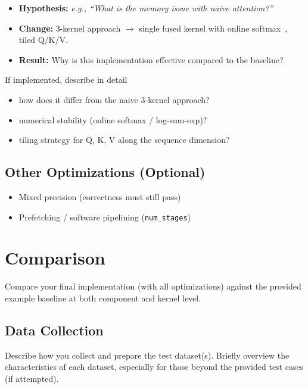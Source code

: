 \documentclass{article} %
\begin{document}
\begin{itemize}
    \item \textbf{Hypothesis:} \textit{e.g., ``What is the memory issue with naive attention?''}
    \item \textbf{Change:} 3-kernel approach $\to$ single fused kernel with online softmax~\citep{dao2023flashattention2fasterattentionbetter}, tiled Q/K/V.
    \item \textbf{Result:} Why is this implementation effective compared to the baseline?
\end{itemize}

If implemented, describe in detail 
\begin{itemize}
    \item how does it differ from the naive 3-kernel approach?
    \item numerical stability (online softmax / log-sum-exp)?
    \item tiling strategy for Q, K, V along the sequence dimension?
\end{itemize}




\subsection{Other Optimizations (Optional)}

\begin{itemize}
    \item Mixed precision (correctness must still pass)
    \item Prefetching / software pipelining (\texttt{num\_stages})
\end{itemize}

\section{Comparison}\label{sec:comparison}

Compare your final implementation (with all optimizations) against the provided example baseline at both component and kernel level.

\subsection{Data Collection}

Describe how you collect and prepare the test dataset(s).
Briefly overview the characteristics of each dataset, especially for those
beyond the provided test cases (if attempted).
\end{document}

